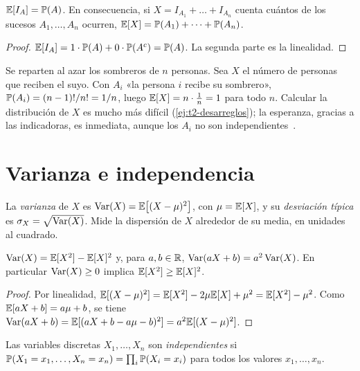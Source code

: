 \begin{proposicion}\label{prop:t5-puente}
$\mathbb{E}[I_A]=\mathbb{P}(A)$. En consecuencia, si $X=I_{A_1}+\dots+I_{A_n}$ cuenta cuántos de los sucesos $A_1,\dots,A_n$ ocurren, $\mathbb{E}[X]=\mathbb{P}(A_1)+\dots+\mathbb{P}(A_n)$.
\end{proposicion}

\begin{proof}
$\mathbb{E}[I_A]=1\cdot\mathbb{P}(A)+0\cdot\mathbb{P}(A^{c})=\mathbb{P}(A)$. La segunda parte es la linealidad.
\end{proof}

\begin{ejemplo}\label{ej:t5-fijos}
Se reparten al azar los sombreros de $n$ personas. Sea $X$ el número de personas que reciben el suyo. Con $A_i$ «la persona $i$ recibe su sombrero», $\mathbb{P}(A_i)=(n-1)!/n!=1/n$, luego $\mathbb{E}[X]=n\cdot\frac1n=1$ para todo $n$. Calcular la distribución de $X$ es mucho más difícil (\cref{ej:t2-desarreglos}); la esperanza, gracias a las indicadoras, es inmediata, aunque los $A_i$ no son independientes~\cite[§4.4]{bh}.
\end{ejemplo}

\section{Varianza e independencia}

\begin{definicion}[Varianza]
La \emph{varianza} de $X$ es $\operatorname{Var}(X)=\mathbb{E}\bigl[(X-\mu)^{2}\bigr]$, con $\mu=\mathbb{E}[X]$, y su \emph{desviación típica} es $\sigma_X=\sqrt{\operatorname{Var}(X)}$. Mide la dispersión de $X$ alrededor de su media, en unidades al cuadrado.
\end{definicion}

\begin{proposicion}\label{prop:t5-var}
$\operatorname{Var}(X)=\mathbb{E}[X^{2}]-\mathbb{E}[X]^{2}$ y, para $a,b\in\mathbb{R}$, $\operatorname{Var}(aX+b)=a^{2}\operatorname{Var}(X)$. En particular $\operatorname{Var}(X)\ge0$ implica $\mathbb{E}[X^{2}]\ge\mathbb{E}[X]^{2}$.
\end{proposicion}

\begin{proof}
Por linealidad, $\mathbb{E}[(X-\mu)^{2}]=\mathbb{E}[X^{2}]-2\mu\mathbb{E}[X]+\mu^{2}=\mathbb{E}[X^{2}]-\mu^{2}$. Como $\mathbb{E}[aX+b]=a\mu+b$, se tiene $\operatorname{Var}(aX+b)=\mathbb{E}[(aX+b-a\mu-b)^{2}]=a^{2}\mathbb{E}[(X-\mu)^{2}]$.
\end{proof}

\begin{definicion}
Las variables discretas $X_1,\dots,X_n$ son \emph{independientes} si $\mathbb{P}(X_1=x_1,\dots,X_n=x_n)=\prod_i\mathbb{P}(X_i=x_i)$ para todos los valores $x_1,\dots,x_n$.
\end{definicion}

